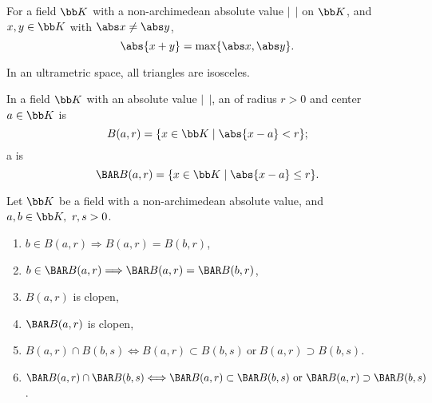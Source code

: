 For a field $\bb K$ with a non-archimedean absolute value $|\ \ |$ on $\bb K$, and $x, y \in \bb K$ with $\abs x \neq \abs y$,
\[
  \abs{x+y} = \max\{ \abs x, \abs y \}.
\]

In an ultrametric space, all triangles are isosceles.

In a field $\bb K$ with an absolute value $|\ \ |$, an  of radius $r > 0$ and center $a \in \bb K$ is
\[
  B(a, r) = \{ x \in \bb K \mid \abs{x - a} < r \};
\]
a  is
\[
  \BAR B(a, r) = \{ x \in  \bb K \mid \abs{x - a} \le r \}.
\]

Let $\bb K$ be a field with a non-archimedean absolute value, and $a, b \in \bb K,\ r, s > 0$.
\begin{enumerate}
  \item $b \in B(a, r) \Longrightarrow B(a, r) = B(b, r)$,
  \item $b \in \BAR B(a, r) \Longrightarrow \BAR B(a, r) = \BAR B(b, r)$,
  \item $B(a, r)$ is clopen,
  \item $\BAR B(a, r)$ is clopen,
  \item $B(a, r) \cap B(b, s) \Longleftrightarrow B(a, r) \subset B(b, s) \ \text{or}\ B(a, r) \supset B(b, s)$.
  \item $\BAR B(a, r) \cap \BAR B(b, s) \Longleftrightarrow \BAR B(a, r) \subset \BAR B(b, s) \ \text{or}\ \BAR B(a, r) \supset \BAR B(b, s)$.
\end{enumerate}
